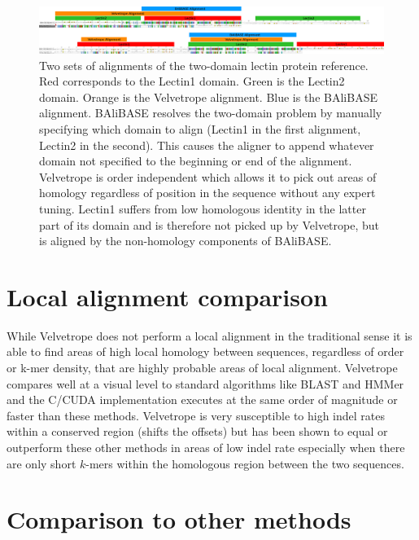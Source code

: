 \documentclass[phd,tocprelim]{cornell}
\begin{document}
 \begin{figure}[htp]%
 \centerline{\includegraphics[width=\textwidth]{figures/velvetrope/Alignments.png}}
 \caption[Multiple sequence alignments]{Two sets of alignments of the two-domain lectin protein reference. Red corresponds to the Lectin1 domain. Green is the Lectin2 domain. Orange is the Velvetrope alignment. Blue is the BAliBASE alignment. BAliBASE resolves the two-domain problem by manually specifying which domain to align (Lectin1 in the first alignment, Lectin2 in the second). This causes the aligner to append whatever domain not specified to the beginning or end of the alignment. Velvetrope is order independent which allows it to pick out areas of homology regardless of position in the sequence without any expert tuning. Lectin1 suffers from low homologous identity in the latter part of its domain and is therefore not picked up by Velvetrope, but is aligned by the non-homology components of BAliBASE.}
 	\label{fig:vr05}
 \end{figure}


\section*{Local alignment comparison}

While Velvetrope does not perform a local alignment in the traditional sense it is able to find areas of high local homology between sequences, regardless of order or k-mer density, that are highly probable areas of local alignment. Velvetrope compares well at a visual level to standard algorithms like BLAST \cite{BLAST} and HMMer \cite{Eddy98} and the C/CUDA implementation executes at the same order of magnitude or faster than these methods. Velvetrope is very susceptible to high indel rates within a conserved region (shifts the offsets) but has been shown to equal or outperform these other methods in areas of low indel rate especially when there are only short $k$-mers within the homologous region between the two sequences.

\pagebreak

\section{Comparison to other methods} %
\label{sec:Comparison to other methods}
\end{document}
